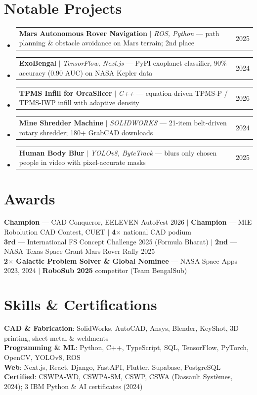 \documentclass[letterpaper,10pt]{article}
\makeatletter
\newcommand{\resumeProjectHeading}[2]{
    \item
    \begin{tabular*}{0.98\textwidth}{l@{\extracolsep{\fill}}r}
      \small#1 & \small #2 \\
    \end{tabular*}\vspace{-1pt}
}
\newcommand{\resumeSubHeadingListStart}{\begin{itemize}[leftmargin=0.1in, label={}]}
\newcommand{\resumeSubHeadingListEnd}{\end{itemize}\vspace{-2pt}}
\makeatother
\begin{document}
\section{Notable Projects}
    \resumeSubHeadingListStart
      \resumeProjectHeading{\textbf{Mars Autonomous Rover Navigation} $|$ \emph{ROS, Python} --- path planning \& obstacle avoidance on Mars terrain; 2nd place}{2025}
      \resumeProjectHeading{\textbf{ExoBengal} $|$ \emph{TensorFlow, Next.js} --- PyPI exoplanet classifier, 90\% accuracy (0.90 AUC) on NASA Kepler data}{2024}
      \resumeProjectHeading{\textbf{TPMS Infill for OrcaSlicer} $|$ \emph{C++} --- equation-driven TPMS-P / TPMS-IWP infill with adaptive density}{2026}
      \resumeProjectHeading{\textbf{Mine Shredder Machine} $|$ \emph{SOLIDWORKS} --- 21-item belt-driven rotary shredder; 180+ GrabCAD downloads}{2024}
      \resumeProjectHeading{\textbf{Human Body Blur} $|$ \emph{YOLOv8, ByteTrack} --- blurs only chosen people in video with pixel-accurate masks}{2025}
    \resumeSubHeadingListEnd
    \vspace{4pt}

\section{Awards}
 \begin{itemize}[leftmargin=0.1in, label={}]
    \small{\item{
     \textbf{Champion} --- CAD Conqueror, EELEVEN AutoFest 2026 $|$ \textbf{Champion} --- MIE Robolution CAD Contest, CUET $|$ \textbf{4$\times$} national CAD podium \\
     \textbf{3rd} --- International FS Concept Challenge 2025 (Formula Bharat) $|$ \textbf{2nd} --- NASA Texas Space Grant Mars Rover Rally 2025 \\
     \textbf{2$\times$ Galactic Problem Solver \& Global Nominee} --- NASA Space Apps 2023, 2024 $|$ \textbf{RoboSub 2025} competitor (Team BengalSub)
    }}
 \end{itemize}
 \vspace{-4pt}

\section{Skills \& Certifications}
 \begin{itemize}[leftmargin=0.1in, label={}]
    \small{\item{
     \textbf{CAD \& Fabrication}: SolidWorks, AutoCAD, Ansys, Blender, KeyShot, 3D printing, sheet metal \& weldments \\
     \textbf{Programming \& ML}: Python, C++, TypeScript, SQL, TensorFlow, PyTorch, OpenCV, YOLOv8, ROS \\
     \textbf{Web}: Next.js, React, Django, FastAPI, Flutter, Supabase, PostgreSQL \\
     \textbf{Certified}: CSWPA-WD, CSWPA-SM, CSWP, CSWA (Dassault Syst\`emes, 2024); 3 IBM Python \& AI certificates (2024)
    }}
 \end{itemize}
 \vspace{-4pt}
\end{document}
